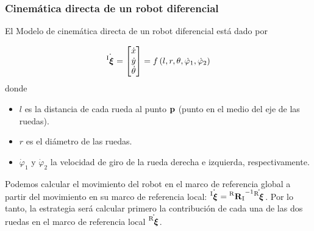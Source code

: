 \begin{frame}
    \frametitle{Cinemática directa de un robot diferencial}
    \scriptsize
    \begin{figure}[!h]
        \centering
    \end{figure}
    
   El Modelo de cinemática directa de un robot diferencial está dado por

    \begin{equation*}
        \dot{\prescript{\mathrm{I}}{}{{\boldsymbol{\mathbf{\xi}}}_\mathrm{}}} =
        \begin{bmatrix}
            \dot{x}\\
            \dot{y}\\
            \dot{\theta}
        \end{bmatrix} =
        f\left( l,r,\theta,\dot{\varphi}_{1},\dot{\varphi}_{2}\right)
    \end{equation*}
    donde
    \begin{itemize}
        \item $l$ es la distancia de cada rueda al punto $\boldsymbol{\mathbf{p}}$ (punto en el medio del eje de las ruedas).
        \item $r$ es el diámetro de las ruedas.
        \item $\dot{\varphi}_{1}$ y $\dot{\varphi}_{2}$ la velocidad de giro de la rueda derecha e izquierda, respectivamente.
    \end{itemize}

    Podemos calcular el movimiento del robot en el marco de referencia global a partir del movimiento en su marco de referencia local:  $\dot{\prescript{\mathrm{I}}{}{{\boldsymbol{\mathbf{\xi}}}_\mathrm{}}} = {\prescript{\mathrm{R}}{}{{\boldsymbol{\mathbf{R}}}_\mathrm{I}}}^{-1}\dot{\prescript{\mathrm{R}}{}{{\boldsymbol{\mathbf{\xi}}}_\mathrm{}}}$. Por lo tanto, la estrategia será calcular primero la contribución de cada una de las dos ruedas en el marco de referencia local $\dot{\prescript{\mathrm{R}}{}{{\boldsymbol{\mathbf{\xi}}}_\mathrm{}}}$.
\end{frame}

